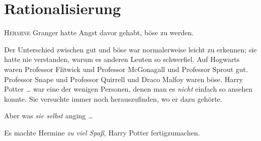 \chapter{Rationalisierung}


\lettrine{H}{ermine} Granger hatte Angst davor gehabt, böse zu werden.

\hplettrineextrapara
Der Unterschied zwischen gut und böse war normalerweise leicht zu erkennen; sie hatte nie verstanden, warum es anderen Leuten so schwerfiel. Auf Hogwarts waren Professor Flitwick und Professor McGonagall und Professor Sprout gut. Professor Snape und Professor Quirrell und Draco Malfoy waren böse. Harry Potter … war eine der wenigen Personen, denen man es \emph{nicht} einfach so ansehen konnte. Sie versuchte immer noch herauszufinden, wo er dazu gehörte.

Aber was \emph{sie selbst} anging …

Es machte Hermine \emph{zu viel Spaß}, Harry Potter fertigzumachen.

